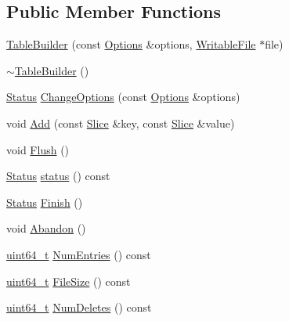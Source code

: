 \subsection*{Public Member Functions}
\begin{DoxyCompactItemize}
\item 
\hyperlink{classleveldb_1_1_table_builder_a7f5d99e06039848d9b342a4871b31cc6}{Table\+Builder} (const \hyperlink{structleveldb_1_1_options}{Options} \&options, \hyperlink{classleveldb_1_1_writable_file}{Writable\+File} $\ast$file)
\item 
\hyperlink{classleveldb_1_1_table_builder_aa166d9bae1402bf2e77f7c45469e715d}{$\sim$\+Table\+Builder} ()
\item 
\hyperlink{classleveldb_1_1_status}{Status} \hyperlink{classleveldb_1_1_table_builder_a6e37a5ddc82161e8665f2fba08031c24}{Change\+Options} (const \hyperlink{structleveldb_1_1_options}{Options} \&options)
\item 
void \hyperlink{classleveldb_1_1_table_builder_a37bd347cb6340215475ac9b42dc19d10}{Add} (const \hyperlink{classleveldb_1_1_slice}{Slice} \&key, const \hyperlink{classleveldb_1_1_slice}{Slice} \&value)
\item 
void \hyperlink{classleveldb_1_1_table_builder_a544560b4c97cd382ba9b8e0ef69dacfa}{Flush} ()
\item 
\hyperlink{classleveldb_1_1_status}{Status} \hyperlink{classleveldb_1_1_table_builder_aaec88faf09425e9c229a69e34656bf80}{status} () const 
\item 
\hyperlink{classleveldb_1_1_status}{Status} \hyperlink{classleveldb_1_1_table_builder_a88f4bae006782e24462362d489dd3f35}{Finish} ()
\item 
void \hyperlink{classleveldb_1_1_table_builder_a3b4dded079f960b8624bdfa13d967b94}{Abandon} ()
\item 
\hyperlink{stdint_8h_aaa5d1cd013383c889537491c3cfd9aad}{uint64\+\_\+t} \hyperlink{classleveldb_1_1_table_builder_a765e1dfcb4e12d0b56fd70e758d9a5c2}{Num\+Entries} () const 
\item 
\hyperlink{stdint_8h_aaa5d1cd013383c889537491c3cfd9aad}{uint64\+\_\+t} \hyperlink{classleveldb_1_1_table_builder_a5844a15a8f94d2c44da709937f29039c}{File\+Size} () const 
\item 
\hyperlink{stdint_8h_aaa5d1cd013383c889537491c3cfd9aad}{uint64\+\_\+t} \hyperlink{classleveldb_1_1_table_builder_a152a2100445ce044d1f57a961dad4f91}{Num\+Deletes} () const 
\end{DoxyCompactItemize}
